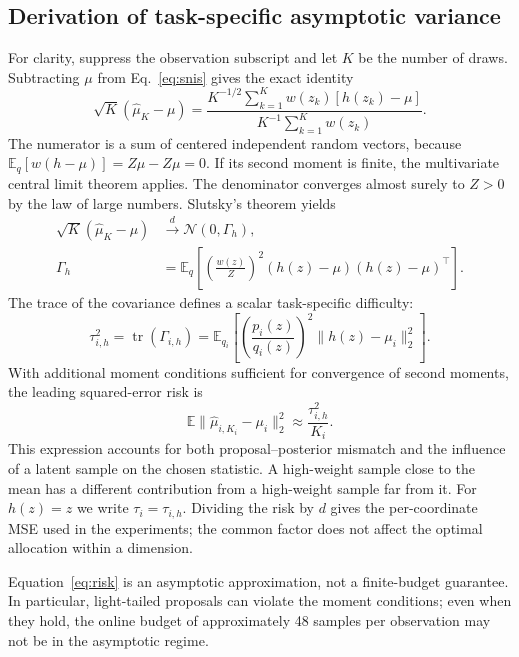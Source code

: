 \documentclass[11pt,letterpaper]{article}
\newcommand{\E}{\mathbb E}
\newcommand{\N}{\mathcal N}
\newcommand{\norm}[1]{\lVert #1\rVert_2}
\begin{document}
\subsection{Derivation of task-specific asymptotic variance}
For clarity, suppress the observation subscript and let $K$ be the number of draws. Subtracting $\mu$ from Eq.~\eqref{eq:snis} gives the exact identity
\begin{equation}
 \sqrt K(\widehat\mu_K-\mu)=\frac{K^{-1/2}\sum_{k=1}^{K}w(z_k)[h(z_k)-\mu]}{K^{-1}\sum_{k=1}^{K}w(z_k)}.
\end{equation}
The numerator is a sum of centered independent random vectors, because $\E_q[w(h-\mu)]=Z\mu-Z\mu=0$. If its second moment is finite, the multivariate central limit theorem applies. The denominator converges almost surely to $Z>0$ by the law of large numbers. Slutsky's theorem yields
\begin{align}
 \sqrt K(\widehat\mu_K-\mu)&\xrightarrow{d}\N(0,\Gamma_h),\\
 \Gamma_h&=\E_q\!\left[\left(\frac{w(z)}{Z}\right)^2(h(z)-\mu)(h(z)-\mu)^\top\right].
\end{align}
The trace of the covariance defines a scalar task-specific difficulty:
\begin{equation}
 \boxed{\tau_{i,h}^{2}=\operatorname{tr}(\Gamma_{i,h})=\E_{q_i}\!\left[\left(\frac{p_i(z)}{q_i(z)}\right)^2\norm{h(z)-\mu_i}^2\right].}
 \label{eq:tau}
\end{equation}
With additional moment conditions sufficient for convergence of second moments, the leading squared-error risk is
\begin{equation}
 \E\norm{\widehat\mu_{i,K_i}-\mu_i}^2\approx\frac{\tau_{i,h}^{2}}{K_i}.
 \label{eq:risk}
\end{equation}
This expression accounts for both proposal--posterior mismatch and the influence of a latent sample on the chosen statistic. A high-weight sample close to the mean has a different contribution from a high-weight sample far from it. For $h(z)=z$ we write $\tau_i=\tau_{i,h}$. Dividing the risk by $d$ gives the per-coordinate MSE used in the experiments; the common factor does not affect the optimal allocation within a dimension.

Equation~\eqref{eq:risk} is an asymptotic approximation, not a finite-budget guarantee. In particular, light-tailed proposals can violate the moment conditions; even when they hold, the online budget of approximately 48 samples per observation may not be in the asymptotic regime.
\clearpage
\end{document}
